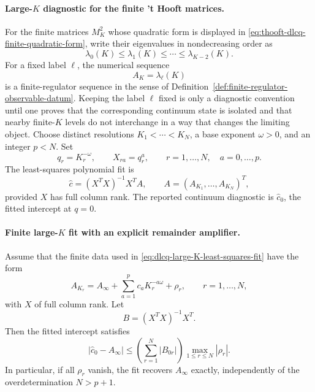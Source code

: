 \paragraph{\texorpdfstring{Large-\(K\) diagnostic for the finite 't Hooft matrices}{Large-K diagnostic for the finite 't Hooft matrices}.}
For the finite matrices \(M_K^2\) whose quadratic form is displayed in
\eqref{eq:thooft-dlcq-finite-quadratic-form}, write their eigenvalues in
nondecreasing order as
\[
  \lambda_0(K)\leq\lambda_1(K)\leq\cdots\leq\lambda_{K-2}(K).
\]
For a fixed label \(\ell\), the numerical sequence
\[
  A_K=\lambda_\ell(K)
\]
is a finite-regulator sequence in the sense of
Definition~\ref{def:finite-regulator-observable-datum}.  Keeping the label
\(\ell\) fixed is only a diagnostic convention until one proves that the
corresponding continuum state is isolated and that nearby finite-\(K\) levels
do not interchange in a way that changes the limiting object.  Choose distinct
resolutions \(K_1<\cdots<K_N\), a base exponent \(\omega>0\), and an integer
\(p<N\).  Set
\[
  q_r=K_r^{-\omega},\qquad
  X_{ra}=q_r^a,\qquad
  r=1,\ldots,N,\quad a=0,\ldots,p .
\]
The least-squares polynomial fit is
\begin{equation}
  \widehat c=(X^T X)^{-1}X^T A,\qquad
  A=(A_{K_1},\ldots,A_{K_N})^T ,
  \label{eq:dlcq-large-K-least-squares-fit}
\end{equation}
provided \(X\) has full column rank.  The reported continuum diagnostic is
\(\widehat c_0\), the fitted intercept at \(q=0\).

\paragraph{\texorpdfstring{Finite large-\(K\) fit with an explicit remainder amplifier}{Finite large-K fit with an explicit remainder amplifier}.}
Assume that the finite data used in
\eqref{eq:dlcq-large-K-least-squares-fit} have the form
\begin{equation}
  A_{K_r}
  =
  A_\infty+\sum_{a=1}^p c_a K_r^{-a\omega}+\rho_r ,
  \qquad r=1,\ldots,N ,
  \label{eq:large-K-fit-model-with-remainder}
\end{equation}
with \(X\) of full column rank.  Let
\[
  B=(X^T X)^{-1}X^T .
\]
Then the fitted intercept satisfies
\begin{equation}
  |\widehat c_0-A_\infty|
  \leq
  \left(\sum_{r=1}^N |B_{0r}|\right)\max_{1\leq r\leq N}|\rho_r| .
  \label{eq:large-K-intercept-remainder-amplification}
\end{equation}
In particular, if all \(\rho_r\) vanish, the fit recovers \(A_\infty\)
exactly, independently of the overdetermination \(N>p+1\).

